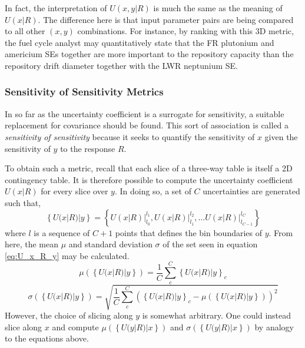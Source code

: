 \documentclass[a4paper, 12pt]{article}
\begin{document}
In fact, the interpretation of $U(x,y|R)$ is much the same as the meaning of $U(x|R)$.  The difference here is that input parameter pairs are being compared to
all other $(x, y)$ combinations.  For instance, by ranking with this 3D metric, the fuel cycle analyst may quantitatively state that the FR plutonium and americium SEs
together are more important to the repository capacity than the repository drift diameter together with the LWR neptunium SE.


\subsubsection{Sensitivity of Sensitivity Metrics}
\label{sec:sensitivity_of_sensitivity_metrics}

In so far as the uncertainty coefficient is a surrogate for sensitivity, a suitable replacement for covariance should be found.
This sort of association is called a \emph{sensitivity of sensitivity} because it seeks
to quantify the sensitivity of $x$ given the sensitivity of  $y$ to the response $R$.

To obtain such a metric, recall that each slice of a three-way table is itself a 2D contingency table.  It is therefore possible to compute the uncertainty
coefficient $U(x|R)$ for every slice over $y$.  In doing so, a set of $C$ uncertainties are generated such that,
\begin{equation}
\left\{U(x|R)|y\right\} = \left\{ \left.U(x|R)\right|_{l_0}^{l_1}, \left.U(x|R)\right|_{l_1}^{l_2}, \ldots \left.U(x|R)\right|_{l_{C-1}}^{l_C}  \right\}
\label{eq:U_x_R_y}
\end{equation}
where $l$ is a sequence of $C+1$ points that defines the bin boundaries of $y$.
From here, the mean $\mu$ and standard deviation $\sigma$ of the set seen in equation \ref{eq:U_x_R_y} may be 
calculated.
\begin{equation} \mu(\left\{U(x|R)|y\right\}) = \frac{1}{C} \sum_c^C \left\{U(x|R)|y\right\}_c \end{equation}
\begin{equation} \sigma(\left\{U(x|R)|y\right\}) = \sqrt{ \frac{1}{C} \sum_c^C \left( \left\{U(x|R)|y\right\}_c - \mu(\left\{U(x|R)|y\right\}) \right)^2 } \end{equation}
However, the choice of slicing along $y$ is somewhat arbitrary.  One could instead slice along $x$ and compute 
$\mu(\left\{U(y|R)|x\right\})$ and $\sigma(\left\{U(y|R)|x\right\})$
by analogy to the equations above.
\end{document}
